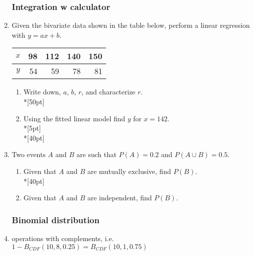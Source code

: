 \documentclass[12pt, oneside]{article}
\begin{document}
\begin{enumerate}
\subsubsection*{Integration w calculator}
\item Given the bivariate data shown in the table below, perform a linear regression with $y=ax+b$.\\
\begin{tabular}{|c|r|r|r|r|}
\hline 
$x$ & 98 & 112 & 140 & 150\\ 
\hline 
$y$ & 54 & 59 & 78 & 81  \\ 
\hline 
\end{tabular}
\begin{enumerate}
    \item Write down, $a$, $b$, $r$, and characterize $r$.\\*[50pt]
\item Using the fitted linear model find $y$ for $x=142$.\\*[5pt]
\\*[40pt]
\end{enumerate}

\item Two events $A$ and $B$ are such that $P(A)=0.2$ and $P(A \cup B) =0.5$. 
\begin{enumerate}
    \item Given that $A$ and $B$ are mutually exclusive, find $P(B)$.\\*[40pt]
    \item Given that $A$ and $B$ are independent, find $P(B)$.
\end{enumerate}

\newpage
\subsubsection*{Binomial distribution}
\item operations with complements, i.e. $1-B_{CDF}(10,8,0.25)=B_{CDF}(10,1,0.75)$


\end{enumerate}
\end{document}
